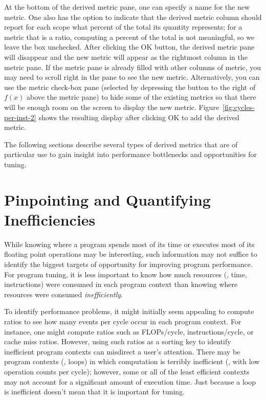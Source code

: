 \documentclass[11pt,letterpaper]{report}
\begin{document}
At the bottom of the derived metric pane, one can specify a name for the new metric.
One also has the option to indicate that the derived metric column should report for each scope what percent of the total its quantity represents; for a metric that is a ratio, computing a percent of the total is not meaningful, so we leave the box unchecked.
After clicking the OK button, the derived metric pane will disappear and the new metric will appear as the rightmost column in the metric pane.
If the metric pane is already filled with other columns of metric, you may need to scroll right in the pane to see the new metric.
Alternatively, you can use the metric check-box pane (selected by depressing the button to the right of $f(x)$ above the metric pane) to hide some of the existing metrics so that there will be enough room on the screen to display the new metric.
Figure~\ref{fig:cycles-per-inst-2} shows the resulting \hpcviewer{} display after clicking OK to add the derived metric.

The following sections describe several types of derived metrics that are of particular use to gain insight into performance bottlenecks and opportunities for tuning.


\section{Pinpointing and Quantifying Inefficiencies}
\label{sec:effective-performance-analysis:inefficiencies}

While knowing where a program spends most of its time or executes most of its floating point operations may be interesting, such information may not suffice to identify the biggest targets of opportunity for improving program performance.
For program tuning, it is less important to know how much resources (\eg, time, instructions) were consumed in each program context than knowing where resources were consumed {\em inefficiently}.

To identify performance problems, it might initially seem appealing to compute ratios to see how many events per cycle occur in each program context.
For instance, one might compute ratios such as FLOPs/cycle, instructions/cycle, or cache miss ratios.
However, using such ratios as a sorting key to identify inefficient program contexts can misdirect a user's attention.
There may be program contexts (\eg, loops) in which computation is terribly inefficient (\eg, with low operation counts per cycle); however, some or all of the least efficient contexts may not account for a significant amount of execution time.
Just because a loop is inefficient doesn't mean that it is important for tuning. 
\end{document}
